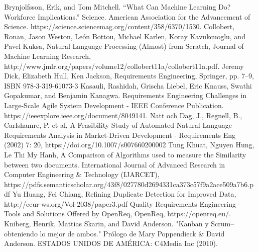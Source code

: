 \documentclass[11pt]{article}
\begin{document}
\begin{thebibliography}{99}

 Brynjolfsson, Erik, and Tom Mitchell. “What Can Machine Learning Do? Workforce Implications.” Science. American Association for the Advancement of Science. https://science.sciencemag.org/content/358/6370/1530.
 Collobert, Ronan, Jason Weston, León Bottou, Michael Karlen, Koray Kavukcuoglu, and Pavel Kuksa, Natural Language Processing (Almost) from Scratch, Journal of Machine Learning Research, http://www.jmlr.org/papers/volume12/collobert11a/collobert11a.pdf.
 Jeremy Dick, Elizabeth Hull, Ken Jackson, Requirements Engineering, Springer, pp. 7–9, ISBN 978-3-319-61073-3
 Kasauli, Rashidah, Grischa Liebel, Eric Knauss, Swathi Gopakumar, and Benjamin Kanagwa. Requirements Engineering Challenges in Large-Scale Agile System Development - IEEE Conference Publication. https://ieeexplore.ieee.org/document/8049141.
 Natt och Dag, J., Regnell, B., Carlshamre, P. et al, A Feasibility Study of Automated Natural Language Requirements Analysis in Market-Driven Development -  Requirements Eng (2002) 7: 20, https://doi.org/10.1007/s007660200002
 Tung Khuat, Nguyen Hung, Le Thi My Hanh, A Comparison of Algorithms used to measure the Similarity between two documents. International Journal of Advanced Research in Computer Engineering \& Technology (IJARCET), https://pdfs.semanticscholar.org/43f8/027780d2694331ca373c57f9a2ace509a7b6.pdf
 Yu Huang, Fei Chiang, Refining Duplicate Detection for Improved Data, http://ceur-ws.org/Vol-2038/paper3.pdf
Quality
 Requirements Engineering - Tools and Solutions Offered by OpenReq, OpenReq, https://openreq.eu/.
 Kniberg, Henrik, Mattias Skarin, and David Anderson. "Kanban y Scrum–obteniendo lo mejor de ambos." Prólogo de Mary Poppendieck \& David Anderson. ESTADOS UNIDOS DE AMÉRICA: C4Media Inc (2010).

\end{thebibliography}
\end{document}
